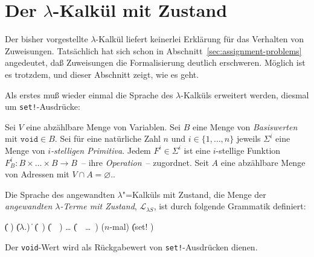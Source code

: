\section{Der $\lambda$-Kalkül mit Zustand}

Der bisher vorgestellte $\lambda$-Kalkül liefert keinerlei Erklärung
für das Verhalten von Zuweisungen.  Tatsächlich hat sich schon in
Abschnitt~\ref{sec:assignment-problems} angedeutet, daß Zuweisungen
die Formalisierung deutlich erschweren.  Möglich ist es trotzdem, und
dieser Abschnitt zeigt, wie es geht.

Als erstes muß wieder einmal die Sprache des $\lambda$-Kalküls
erweitert werden, diesmal um \texttt{set!}-Ausdrücke:
%
\begin{definition}
  Sei $V$ eine abzählbare Menge von Variablen.  Sei $B$ eine Menge von
  \textit{Basiswerten} mit $\mathtt{void} \in B$.
  Sei für eine natürliche Zahl $n$ und $i \in \{1, \ldots, n\}$
  jeweils $\Sigma^i$ eine Menge von \textit{$i$-stelligen
    Primitiva}.  Jedem $F^i\in\Sigma^i$ ist eine
  $i$-stellige Funktion $F_B^i: B\times\ldots\times B \rightarrow
  B$~-- ihre \textit{Operation}~-- zugordnet.
  Seit $A$ eine abzählbare Menge von Adressen mit $V\cap A =
  \varnothing$.. 

  Die Sprache des angewandten $\lambda$"=Kalküls mit Zustand, die
  Menge der \textit{angewandten $\lambda$-Terme mit Zustand},
  $\mathcal{L}_{\lambda{}S}$, ist
  durch folgende Grammatik definiert:
  \begin{grammar}
     \: 
    \> \| ( )
    \> \| ($\lambda$.)
    \> \| 
    \> \| (~)
    \> \| (~~)
    \> \ldots
    \> \| (~~\ldots~)  \quad \textrm{($n$-mal)}
    \> \| (set!  )
  \end{grammar}
\end{definition}
%
Der \texttt{void}-Wert wird als Rückgabewert von
\texttt{set!}-Ausdrücken dienen.

